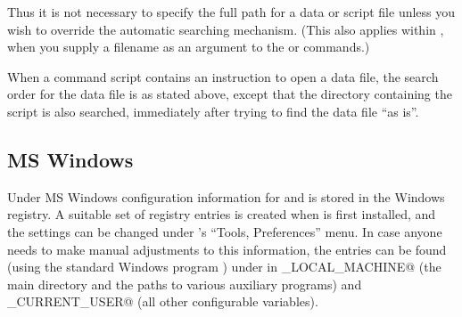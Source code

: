Thus it is not necessary to specify the full path for a data or script
file unless you wish to override the automatic searching
mechanism. (This also applies within , when you supply a
filename as an argument to the  or  commands.)

When a command script contains an instruction to open a data file, the
search order for the data file is as stated above, except that the
directory containing the script is also searched, immediately after
trying to find the data file ``as is''.
      

\subsection{MS Windows}
\label{MS-behave}

Under MS Windows configuration information for  and
 is stored in the Windows registry. A suitable set of
registry entries is created when  is first installed, and
the settings can be changed under 's ``Tools, Preferences''
menu. In case anyone needs to make manual adjustments to this
information, the entries can be found (using the standard Windows
program ) under \verb@Software\gretl@ in
\verb@HKEY_LOCAL_MACHINE@ (the main  directory and the
paths to various auxiliary programs) and \verb@HKEY_CURRENT_USER@ (all
other configurable variables).

